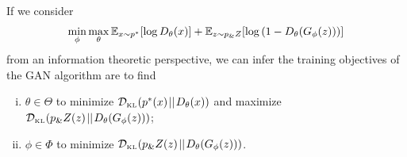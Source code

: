 \begin{proposition}%
  \label{thm:info-objective}%
  If we consider
  \begin{align}
    \label{eq:consider}
    \min_\phi \max_\theta \mathbb{E}_{x \sim p^*}[{\log D_\theta(x)}] + \mathbb{E}_{z
    \sim p_\&Z}[\log{(1 - D_\theta(G_\phi(z)))}]
  \end{align}
  from an information theoretic perspective, we can infer the training
  objectives of the GAN algorithm are to find
\begin{enumerate}[(i)]
  \item $\theta \in \Theta$ to minimize $\KL{\ptx}{\D(x)}$ and
    maximize $\KL{\pzz}{\D(\G(z))}$;
  \item $\phi \in \Phi$ to minimize $\KL{\pzz}{\D(\G(z))}$.
  \end{enumerate}
\end{proposition}

